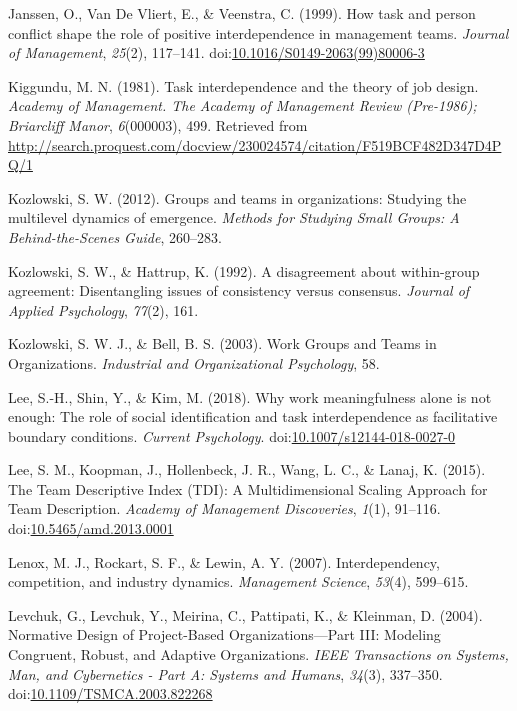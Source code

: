 \documentclass[english,,man]{apa6}
\theoremstyle{definition}
\theoremstyle{definition}
\theoremstyle{definition}
\theoremstyle{remark}
\begin{document}
\leavevmode\hypertarget{ref-janssen_how_1999}{}%
Janssen, O., Van De Vliert, E., \& Veenstra, C. (1999). How task and
person conflict shape the role of positive interdependence in management
teams. \emph{Journal of Management}, \emph{25}(2), 117--141.
doi:\href{https://doi.org/10.1016/S0149-2063(99)80006-3}{10.1016/S0149-2063(99)80006-3}

\leavevmode\hypertarget{ref-kiggundu_task_1981}{}%
Kiggundu, M. N. (1981). Task interdependence and the theory of job
design. \emph{Academy of Management. The Academy of Management Review
(Pre-1986); Briarcliff Manor}, \emph{6}(000003), 499. Retrieved from
\url{http://search.proquest.com/docview/230024574/citation/F519BCF482D347D4PQ/1}

\leavevmode\hypertarget{ref-kozlowski_groups_2012}{}%
Kozlowski, S. W. (2012). Groups and teams in organizations: Studying the
multilevel dynamics of emergence. \emph{Methods for Studying Small
Groups: A Behind-the-Scenes Guide}, 260--283.

\leavevmode\hypertarget{ref-kozlowski1992disagreement}{}%
Kozlowski, S. W., \& Hattrup, K. (1992). A disagreement about
within-group agreement: Disentangling issues of consistency versus
consensus. \emph{Journal of Applied Psychology}, \emph{77}(2), 161.

\leavevmode\hypertarget{ref-kozlowski_work_nodate}{}%
Kozlowski, S. W. J., \& Bell, B. S. (2003). Work Groups and Teams in
Organizations. \emph{Industrial and Organizational Psychology}, 58.

\leavevmode\hypertarget{ref-lee_why_2018}{}%
Lee, S.-H., Shin, Y., \& Kim, M. (2018). Why work meaningfulness alone
is not enough: The role of social identification and task
interdependence as facilitative boundary conditions. \emph{Current
Psychology}.
doi:\href{https://doi.org/10.1007/s12144-018-0027-0}{10.1007/s12144-018-0027-0}

\leavevmode\hypertarget{ref-lee_team_2015}{}%
Lee, S. M., Koopman, J., Hollenbeck, J. R., Wang, L. C., \& Lanaj, K.
(2015). The Team Descriptive Index (TDI): A Multidimensional Scaling
Approach for Team Description. \emph{Academy of Management Discoveries},
\emph{1}(1), 91--116.
doi:\href{https://doi.org/10.5465/amd.2013.0001}{10.5465/amd.2013.0001}

\leavevmode\hypertarget{ref-lenox_interdependency_2007}{}%
Lenox, M. J., Rockart, S. F., \& Lewin, A. Y. (2007). Interdependency,
competition, and industry dynamics. \emph{Management Science},
\emph{53}(4), 599--615.

\leavevmode\hypertarget{ref-levchuk_normative_2004}{}%
Levchuk, G., Levchuk, Y., Meirina, C., Pattipati, K., \& Kleinman, D.
(2004). Normative Design of Project-Based Organizations---Part III:
Modeling Congruent, Robust, and Adaptive Organizations. \emph{IEEE
Transactions on Systems, Man, and Cybernetics - Part A: Systems and
Humans}, \emph{34}(3), 337--350.
doi:\href{https://doi.org/10.1109/TSMCA.2003.822268}{10.1109/TSMCA.2003.822268}
\end{document}
